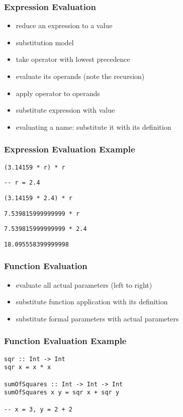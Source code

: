 \documentclass[dvipsnames]{beamer}
\theoremstyle{plain}
\begin{document}
\begin{frame}
  \frametitle{Expression Evaluation}

  \begin{itemize}
    \item reduce an expression to a value
    \item substitution model

    \pause
    \bigskip
    \item take operator with lowest precedence
    \item evaluate its operands (note the recursion)
    \item apply operator to operands
    \item substitute expression with value

    \medskip
    \item evaluating a name: substitute it with its definition
  \end{itemize}
\end{frame}

\begin{frame}
  \frametitle{Expression Evaluation Example}

  \lstinline|(3.14159 * r) * r|

  \medskip
  \lstinline|-- r = 2.4|

  \pause
  \bigskip
  \lstinline|(3.14159 * 2.4) * r|

  \pause
  \medskip
  \lstinline|7.539815999999999 * r|

  \pause
  \medskip
  \lstinline|7.539815999999999 * 2.4|

  \pause
  \medskip
  \lstinline|18.095558399999998|
\end{frame}

\begin{frame}
  \frametitle{Function Evaluation}

  \begin{itemize}
    \item evaluate all actual parameters (left to right)

    \medskip
    \item substitute function application with its definition
    \item substitute formal parameters with actual parameters
  \end{itemize}
\end{frame}

\begin{frame}[fragile]
  \frametitle{Function Evaluation Example}

  \begin{lstlisting}
sqr :: Int -> Int
sqr x = x * x

sumOfSquares :: Int -> Int -> Int
sumOfSquares x y = sqr x + sqr y

-- x = 3, y = 2 + 2
  \end{lstlisting}
\end{frame}
\end{document}
